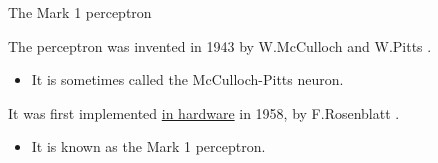 %
%
%

\begin{frame}[t]{The Mark 1 perceptron}

    The perceptron was invented in 1943 
    by W.McCulloch and W.Pitts \cite{McCulloch:1943p}.
    \begin{itemize}
      \item It is sometimes called the \gls{McCulloch-Pitts neuron}.
    \end{itemize}

    It was first implemented \underline{in hardware} in 1958, 
    by F.\gls{Rosenblatt} \cite{Rosenblatt:1958p}.
    \begin{itemize}
        \item It is known as the \gls{Mark 1 perceptron}.
      \end{itemize}
  

\end{frame}
